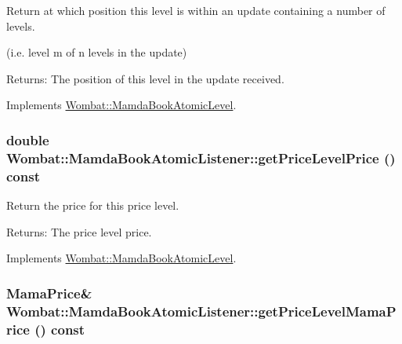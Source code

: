 Return at which position this level is within an update containing a number of levels. 

(i.e. level m of n levels in the update)

\begin{Desc}
\item[Returns:]The position of this level in the update received. \end{Desc}


Implements \hyperlink{classWombat_1_1MamdaBookAtomicLevel_9805eb2f6cd0313e9923070c2f50bf1a}{Wombat::Mamda\-Book\-Atomic\-Level}.\hypertarget{classWombat_1_1MamdaBookAtomicListener_7139c6ddcae27c429e7dade0c5e91358}{
\subsubsection[getPriceLevelPrice]{\setlength{\rightskip}{0pt plus 5cm}double Wombat::Mamda\-Book\-Atomic\-Listener::get\-Price\-Level\-Price () const}}
\label{classWombat_1_1MamdaBookAtomicListener_7139c6ddcae27c429e7dade0c5e91358}


Return the price for this price level. 

\begin{Desc}
\item[Returns:]The price level price. \end{Desc}


Implements \hyperlink{classWombat_1_1MamdaBookAtomicLevel_5bcc378cd2085048f8fa1870265e5ce0}{Wombat::Mamda\-Book\-Atomic\-Level}.\hypertarget{classWombat_1_1MamdaBookAtomicListener_a71f90d4ad1c3297f35676b7a4363488}{
\subsubsection[getPriceLevelMamaPrice]{\setlength{\rightskip}{0pt plus 5cm}Mama\-Price\& Wombat::Mamda\-Book\-Atomic\-Listener::get\-Price\-Level\-Mama\-Price () const}}
\label{classWombat_1_1MamdaBookAtomicListener_a71f90d4ad1c3297f35676b7a4363488}


